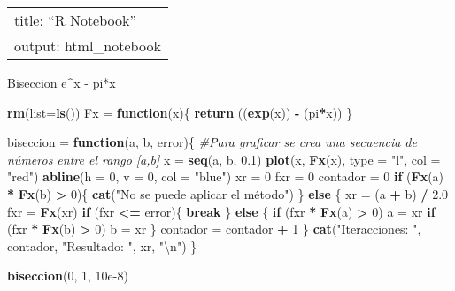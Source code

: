 \documentclass[]{article}
\title{}
\author{}
\date{}
\newenvironment{Shaded}{\begin{snugshade}}{\end{snugshade}}
\newcommand{\CharTok}[1]{\textcolor[rgb]{0.31,0.60,0.02}{#1}}
\newcommand{\CommentTok}[1]{\textcolor[rgb]{0.56,0.35,0.01}{\textit{#1}}}
\newcommand{\ControlFlowTok}[1]{\textcolor[rgb]{0.13,0.29,0.53}{\textbf{#1}}}
\newcommand{\DataTypeTok}[1]{\textcolor[rgb]{0.13,0.29,0.53}{#1}}
\newcommand{\DecValTok}[1]{\textcolor[rgb]{0.00,0.00,0.81}{#1}}
\newcommand{\FloatTok}[1]{\textcolor[rgb]{0.00,0.00,0.81}{#1}}
\newcommand{\KeywordTok}[1]{\textcolor[rgb]{0.13,0.29,0.53}{\textbf{#1}}}
\newcommand{\NormalTok}[1]{#1}
\newcommand{\OperatorTok}[1]{\textcolor[rgb]{0.81,0.36,0.00}{\textbf{#1}}}
\newcommand{\StringTok}[1]{\textcolor[rgb]{0.31,0.60,0.02}{#1}}
\begin{document}
\begin{longtable}[]{@{}l@{}}
\toprule
\endhead
title: ``R Notebook''\tabularnewline
output: html\_notebook\tabularnewline
\bottomrule
\end{longtable}

Biseccion e\^{}x - pi*x

\begin{Shaded}
\begin{Highlighting}[]
\KeywordTok{rm}\NormalTok{(}\DataTypeTok{list=}\KeywordTok{ls}\NormalTok{())}
\NormalTok{Fx =}\StringTok{ }\ControlFlowTok{function}\NormalTok{(x)\{}
  \KeywordTok{return}\NormalTok{ ((}\KeywordTok{exp}\NormalTok{(x)) }\OperatorTok{-}\StringTok{ }\NormalTok{(pi}\OperatorTok{*}\NormalTok{x))}
\NormalTok{\}}

\NormalTok{biseccion =}\StringTok{ }\ControlFlowTok{function}\NormalTok{(a, b, error)\{}
  \CommentTok{#Para graficar se crea una secuencia de números entre el rango [a,b]}
\NormalTok{  x =}\StringTok{ }\KeywordTok{seq}\NormalTok{(a, b, }\FloatTok{0.1}\NormalTok{)}
  \KeywordTok{plot}\NormalTok{(x, }\KeywordTok{Fx}\NormalTok{(x), }\DataTypeTok{type =} \StringTok{"l"}\NormalTok{, }\DataTypeTok{col =} \StringTok{"red"}\NormalTok{)}
  \KeywordTok{abline}\NormalTok{(}\DataTypeTok{h =} \DecValTok{0}\NormalTok{, }\DataTypeTok{v =} \DecValTok{0}\NormalTok{, }\DataTypeTok{col =} \StringTok{"blue"}\NormalTok{)}
\NormalTok{  xr =}\StringTok{ }\DecValTok{0}
\NormalTok{  fxr =}\StringTok{ }\DecValTok{0}
\NormalTok{  contador =}\StringTok{ }\DecValTok{0}
  \ControlFlowTok{if}\NormalTok{ (}\KeywordTok{Fx}\NormalTok{(a) }\OperatorTok{*}\StringTok{ }\KeywordTok{Fx}\NormalTok{(b) }\OperatorTok{>}\StringTok{ }\DecValTok{0}\NormalTok{)\{}
    \KeywordTok{cat}\NormalTok{(}\StringTok{"No se puede aplicar el método"}\NormalTok{)}
\NormalTok{  \}}
  \ControlFlowTok{else}\NormalTok{ \{}
\NormalTok{    xr =}\StringTok{ }\NormalTok{(a }\OperatorTok{+}\StringTok{ }\NormalTok{b) }\OperatorTok{/}\StringTok{ }\FloatTok{2.0}
\NormalTok{    fxr =}\StringTok{ }\KeywordTok{Fx}\NormalTok{(xr)}
    \ControlFlowTok{if}\NormalTok{ (fxr }\OperatorTok{<=}\StringTok{ }\NormalTok{error)\{}
      \ControlFlowTok{break}
\NormalTok{    \} }\ControlFlowTok{else}\NormalTok{ \{}
      \ControlFlowTok{if}\NormalTok{ (fxr }\OperatorTok{*}\StringTok{ }\KeywordTok{Fx}\NormalTok{(a) }\OperatorTok{>}\StringTok{ }\DecValTok{0}\NormalTok{)}
\NormalTok{        a =}\StringTok{ }\NormalTok{xr}
      \ControlFlowTok{if}\NormalTok{ (fxr }\OperatorTok{*}\StringTok{ }\KeywordTok{Fx}\NormalTok{(b) }\OperatorTok{>}\StringTok{ }\DecValTok{0}\NormalTok{)}
\NormalTok{        b =}\StringTok{ }\NormalTok{xr}
\NormalTok{    \}}
\NormalTok{    contador =}\StringTok{ }\NormalTok{contador }\OperatorTok{+}\StringTok{ }\DecValTok{1}
\NormalTok{  \}}
  \KeywordTok{cat}\NormalTok{(}\StringTok{"Iteracciones: "}\NormalTok{, contador, }\StringTok{"Resultado: "}\NormalTok{, xr, }\StringTok{"}\CharTok{\textbackslash{}n}\StringTok{"}\NormalTok{)}
\NormalTok{\}}

\KeywordTok{biseccion}\NormalTok{(}\DecValTok{0}\NormalTok{, }\DecValTok{1}\NormalTok{, }\FloatTok{10e-8}\NormalTok{)}
\end{Highlighting}
\end{Shaded}
\end{document}
